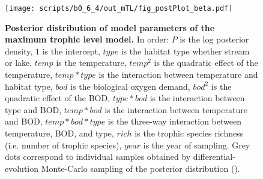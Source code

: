 \documentclass[11pt, oneside]{article}
\begin{document}
\begin{figure}[H]
\begin{center}
\texttt{[image: scripts/b0\_6\_4/out\_mTL/fig\_postPlot\_beta.pdf]}
\caption{
    \textbf{Posterior distribution of model parameters of the maximum trophic level model.}
    In order: $P$ is the log posterior density, $1$ is the intercept, $type$ is the habitat type whether stream or lake, $temp$ is the temperature, $temp^2$ is the quadratic effect of the temperature, $temp * type$ is the interaction between temperature and habitat type, $bod$ is the biological oxygen demand, $bod^2$ is the quadratic effect of the BOD, $type * bod$ is the interaction between type and BOD, $temp * bod$ is the interaction between temperature and BOD, $temp * bod * type$ is the three-way interaction between temperature, BOD, and type, $rich$ is the trophic species richness (i.e. number of trophic species), $year$ is the year of sampling.
    Grey dots correspond to individual samples obtained by differential-evolution Monte-Carlo sampling of the posterior distribution (\cite{TerBraak2006}). 
} 
\end{center}
\end{figure}
\end{document}
